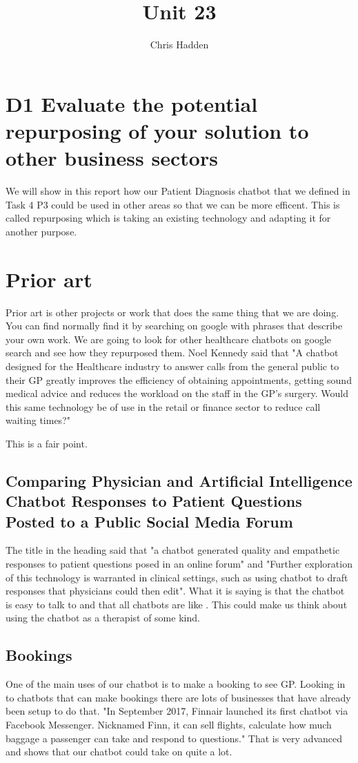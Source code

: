 \documentclass{article}
\title{Unit 23}
\author{Chris Hadden}
\date{}
\begin{document}
\maketitle
\section{D1 Evaluate the potential repurposing of your solution to other business sectors}
We will show in this report how our Patient Diagnosis chatbot that we defined in Task 4 P3 could be used in other areas so that we can be more efficent. This is called repurposing which is taking an existing technology and adapting it for another purpose.
\smallbreak

\section{Prior art}
Prior art is other projects or work that does the same thing that we are doing. You can find normally find it by searching on google with phrases that describe your own work. We are going to look for other healthcare chatbots on google search and see how they repurposed them.
\smallbreak
Noel Kennedy said that "A chatbot designed for the Healthcare industry to answer calls from the general public to their GP greatly improves the efficiency of obtaining appointments, getting sound medical advice and reduces the workload on the staff in the GP's surgery. Would this same technology be of use in the retail or finance sector to reduce call waiting times?" \cite{Noel}

This is a fair point.
\smallbreak

\subsection{Comparing Physician and Artificial Intelligence Chatbot Responses to Patient Questions Posted to a Public Social Media Forum}
The title in the heading\cite{bedside} said that "a chatbot generated quality and empathetic responses to patient questions posed in an online forum" and "Further exploration of this technology is warranted in clinical settings, such as using chatbot to draft responses that physicians could then edit". What it is saying is that the chatbot is easy to talk to and that all chatbots are like . This could make us think about using the chatbot as a therapist of some kind.


\subsection{Bookings}\label{booking}
One of the main uses of our chatbot is to make a booking to see GP. Looking in to chatbots that can make bookings there are lots of businesses that have already been setup to do that.\cite{futr}\cite{booking}\cite{velma} "In September 2017, Finnair launched its first chatbot via Facebook Messenger. Nicknamed Finn, it can sell flights, calculate how much baggage a passenger can take and respond to questions."\cite{booking} That is very advanced and shows that our chatbot could take on quite a lot.
\end{document}
